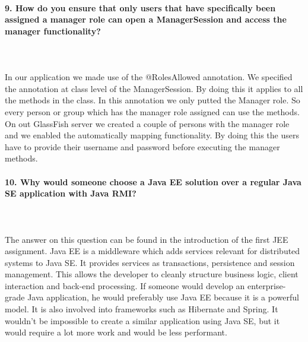 \documentclass{ds-report}
\begin{document}
	\paragraph{9. How do you ensure that only users that have specifically been assigned a manager role can open a ManagerSession and access the manager functionality?} \mbox{}\\\\
In our application we made use of the @RolesAllowed annotation. We specified the annotation at class level of the ManagerSession. By doing this it applies to all the methods in the class. In this annotation we only putted the Manager role. So every person or group which has the manager role assigned can use the methods.
On out GlassFish server we created a couple of persons with the manager role and we enabled the automatically mapping functionality. By doing this the users have to provide their username and password before executing the manager methods. 
	
	
	\paragraph{10.  Why would someone choose a Java EE solution over a regular Java SE application with Java RMI?} \mbox{}\\\\
The answer on this question can be found in the introduction of the first JEE assignment. Java EE is a middleware which adds services relevant for distributed systems to Java SE. It provides services as transactions, persistence and session management. This allows the developer to cleanly structure business logic, client interaction and back-end processing.
If someone would develop an enterprise-grade Java application, he would preferably use Java EE because it is a powerful model. It is also involved into frameworks such as Hibernate and Spring. It wouldn't be impossible to create a similar application using Java SE, but it would require a lot more work and would be less performant. 
\end{document}
